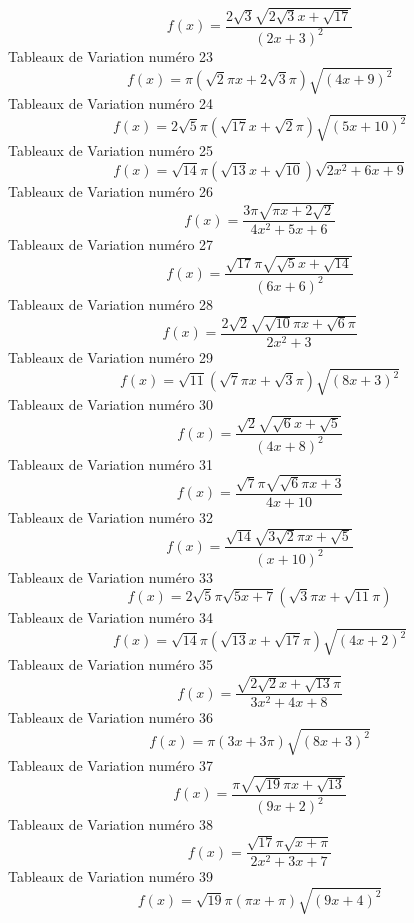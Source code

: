 \documentclass{article}
\begin{document}
\[f(x) = \frac{2 \sqrt{3} \sqrt{2 \sqrt{3} x + \sqrt{17}}}{\left(2 x + 3\right)^{2}}\]Tableaux de Variation num\'ero 23 \[f(x) = \pi \left(\sqrt{2} \pi x + 2 \sqrt{3} \pi\right) \sqrt{\left(4 x + 9\right)^{2}}\]Tableaux de Variation num\'ero 24 \[f(x) = 2 \sqrt{5} \pi \left(\sqrt{17} x + \sqrt{2} \pi\right) \sqrt{\left(5 x + 10\right)^{2}}\]Tableaux de Variation num\'ero 25 \[f(x) = \sqrt{14} \pi \left(\sqrt{13} x + \sqrt{10}\right) \sqrt{2 x^{2} + 6 x + 9}\]Tableaux de Variation num\'ero 26 \[f(x) = \frac{3 \pi \sqrt{\pi x + 2 \sqrt{2}}}{4 x^{2} + 5 x + 6}\]Tableaux de Variation num\'ero 27 \[f(x) = \frac{\sqrt{17} \pi \sqrt{\sqrt{5} x + \sqrt{14}}}{\left(6 x + 6\right)^{2}}\]Tableaux de Variation num\'ero 28 \[f(x) = \frac{2 \sqrt{2} \sqrt{\sqrt{10} \pi x + \sqrt{6} \pi}}{2 x^{2} + 3}\]Tableaux de Variation num\'ero 29 \[f(x) = \sqrt{11} \left(\sqrt{7} \pi x + \sqrt{3} \pi\right) \sqrt{\left(8 x + 3\right)^{2}}\]Tableaux de Variation num\'ero 30 \[f(x) = \frac{\sqrt{2} \sqrt{\sqrt{6} x + \sqrt{5}}}{\left(4 x + 8\right)^{2}}\]Tableaux de Variation num\'ero 31 \[f(x) = \frac{\sqrt{7} \pi \sqrt{\sqrt{6} \pi x + 3}}{4 x + 10}\]Tableaux de Variation num\'ero 32 \[f(x) = \frac{\sqrt{14} \sqrt{3 \sqrt{2} \pi x + \sqrt{5}}}{\left(x + 10\right)^{2}}\]Tableaux de Variation num\'ero 33 \[f(x) = 2 \sqrt{5} \pi \sqrt{5 x + 7} \left(\sqrt{3} \pi x + \sqrt{11} \pi\right)\]Tableaux de Variation num\'ero 34 \[f(x) = \sqrt{14} \pi \left(\sqrt{13} x + \sqrt{17} \pi\right) \sqrt{\left(4 x + 2\right)^{2}}\]Tableaux de Variation num\'ero 35 \[f(x) = \frac{\sqrt{2 \sqrt{2} x + \sqrt{13} \pi}}{3 x^{2} + 4 x + 8}\]Tableaux de Variation num\'ero 36 \[f(x) = \pi \left(3 x + 3 \pi\right) \sqrt{\left(8 x + 3\right)^{2}}\]Tableaux de Variation num\'ero 37 \[f(x) = \frac{\pi \sqrt{\sqrt{19} \pi x + \sqrt{13}}}{\left(9 x + 2\right)^{2}}\]Tableaux de Variation num\'ero 38 \[f(x) = \frac{\sqrt{17} \pi \sqrt{x + \pi}}{2 x^{2} + 3 x + 7}\]Tableaux de Variation num\'ero 39 \[f(x) = \sqrt{19} \pi \left(\pi x + \pi\right) \sqrt{\left(9 x + 4\right)^{2}}\]
\end{document}
